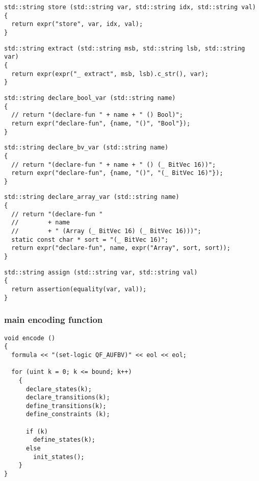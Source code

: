 \begin{lstlisting}[style=c++]
std::string store (std::string var, std::string idx, std::string val)
{
  return expr("store", var, idx, val);
}
\end{lstlisting}

\begin{lstlisting}[style=c++]
std::string extract (std::string msb, std::string lsb, std::string var)
{
  return expr(expr("_ extract", msb, lsb).c_str(), var);
}
\end{lstlisting}

\begin{lstlisting}[style=c++]
std::string declare_bool_var (std::string name)
{
  // return "(declare-fun " + name + " () Bool)";
  return expr("declare-fun", {name, "()", "Bool"});
}
\end{lstlisting}

\begin{lstlisting}[style=c++]
std::string declare_bv_var (std::string name)
{
  // return "(declare-fun " + name + " () (_ BitVec 16))";
  return expr("declare-fun", {name, "()", "(_ BitVec 16)"});
}
\end{lstlisting}

\begin{lstlisting}[style=c++]
std::string declare_array_var (std::string name)
{
  // return "(declare-fun "
  //        + name
  //        + " (Array (_ BitVec 16) (_ BitVec 16)))";
  static const char * sort = "(_ BitVec 16)";
  return expr("declare-fun", name, expr("Array", sort, sort));
}
\end{lstlisting}

\begin{lstlisting}[style=c++]
std::string assign (std::string var, std::string val)
{
  return assertion(equality(var, val));
}
\end{lstlisting}

\subsubsection{main encoding function}

\begin{lstlisting}[style=c++]
void encode ()
{
  formula << "(set-logic QF_AUFBV)" << eol << eol;

  for (uint k = 0; k <= bound; k++)
    {
      declare_states(k);
      declare_transitions(k);
      define_transitions(k);
      define_constraints (k);

      if (k)
        define_states(k);
      else
        init_states();
    }
}
\end{lstlisting}

